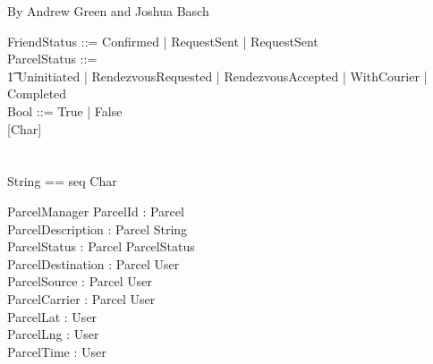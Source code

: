 \documentclass{article}
\begin{document}
By Andrew Green and Joshua Basch\\

\begin{zed}
	FriendStatus ::= Confirmed | RequestSent | RequestSent\\
	ParcelStatus ::= \\
	\t1 Uninitiated | RendezvousRequested | RendezvousAccepted | WithCourier | Completed \\
	Bool ::= True | False\\
	
[Char]\\
[User]\\
[Parcel]\\
String == seq Char\\
\end{zed}


\begin{schema}{ParcelManager}
	ParcelId : Parcel \mapsto \natural\\
	ParcelDescription : Parcel \mapsto String\\
	ParcelStatus : Parcel \mapsto ParcelStatus\\
	ParcelDestination : Parcel \mapsto User\\
	ParcelSource : Parcel \mapsto User\\
	ParcelCarrier : Parcel \mapsto User\\
	ParcelLat : User \mapsto \real\\
	ParcelLng : User \mapsto \real\\
	ParcelTime : User \mapsto \natural\\
	\where
\end{schema}
\end{document}
